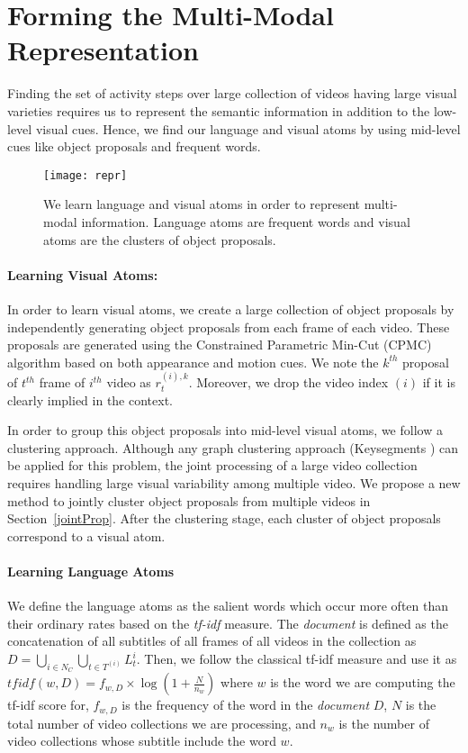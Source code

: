 \section{Forming the Multi-Modal Representation}
\label{atom}
Finding the set of activity steps over large collection of videos having large visual varieties requires us to represent the semantic information in addition to the low-level visual cues. Hence, we find our language and visual atoms by using mid-level cues like object proposals and frequent words.

\begin{figure}[h]
  \texttt{[image: repr]}
  \vspace{-5mm}
  \caption{We learn language and visual atoms in order to represent multi-modal information. Language atoms are frequent words and visual atoms are the clusters of object proposals.}
\label{fig:overview}
\end{figure}


\paragraph{Learning Visual Atoms:} In order to learn visual atoms, we create a large collection of object proposals by independently generating object proposals from each frame of each video. These proposals are generated using the Constrained Parametric Min-Cut (CPMC) \cite{cpmc} algorithm based on both appearance and motion cues. We note the $k^{th}$ proposal of $t^{th}$ frame of $i^{th}$ video as $r^{(i),k}_t$. Moreover, we drop the video index $(i)$ if it is clearly implied in the context.

In order to group this object proposals into mid-level visual atoms, we follow a clustering approach. Although any graph clustering approach (\eg Keysegments \cite{keysegments}) can be applied for this problem, the joint processing of a large video collection requires handling large visual variability among multiple video. We propose a new method to jointly cluster object proposals from multiple videos in Section~\ref{jointProp}. After the clustering stage, each cluster of object proposals correspond to a visual atom.

\paragraph{Learning Language Atoms}
We define the language atoms as the salient words which occur more often than their ordinary rates based on the \emph{tf-idf} measure. The \emph{document} is defined as the concatenation of all subtitles of all frames of all videos in the collection as $D=\bigcup_{i \in N_C} \bigcup_{t \in T^{(i)}} L_t^i$. Then, we follow the classical tf-idf measure and use it as $tfidf(w,D)=f_{w,D} \times \log \left( 1+ \frac{N}{n_{w}}\right)$ where $w$ is the word we are computing the tf-idf score for, $f_{w,D}$ is the frequency of the word in the \emph{document} $D$, $N$ is the total number of video collections we are processing, and $n_{w}$ is the number of video collections whose subtitle include the word $w$.

